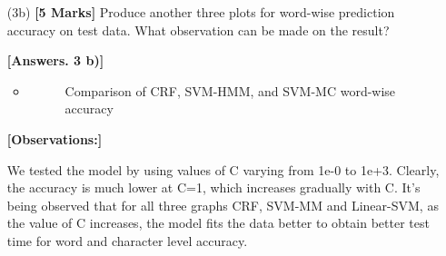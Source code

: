 \documentclass[11pt]{report}
\begin{document}
\begin{itemize}
	\item[(3b)] {\bf [5 Marks]} Produce another three plots for word-wise prediction accuracy on test data.  What observation can be made on the result?
    	
    	
    {\bf [Answers. 3 b)]} 
	\begin{itemize}
	    \item 
	    	\begin{figure}[H]
            	\centering
            	\caption{Comparison of CRF, SVM-HMM, and SVM-MC word-wise accuracy}
            	\label{fig:compare_optimizer}
            \end{figure}
	\end{itemize}
	
	{\bf [Observations:]}
	
	We tested the model by using values of C varying from 1e-0 to 1e+3. Clearly, the accuracy is much lower at C=1, which increases gradually with C. It's being observed that for all three graphs CRF, SVM-MM and Linear-SVM, as the value of C increases, the model fits the data better to obtain better test time for word and character level accuracy.
	
\end{itemize}
\end{document}
